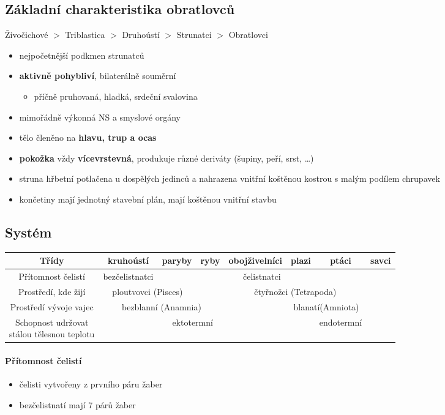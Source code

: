 \subsection{Základní charakteristika obratlovců}
Živočichové $>$ Triblastica $>$ Druhoústí $>$ Strunatci $>$ Obratlovci
\begin{itemize}
\item nejpočetnější podkmen strunatců
\item \textbf{aktivně pohybliví}, bilaterálně souměrní
	\begin{itemize}
	\item příčně pruhovaná, hladká, srdeční svalovina
	\end{itemize}
\item mimořádně výkonná NS a smyslové orgány
\item tělo členěno na \textbf{hlavu, trup a ocas}
\item \textbf{pokožka} vždy \textbf{vícevrstevná}, produkuje různé deriváty (šupiny, peří, srst, \ldots)
\item struna hřbetní potlačena u dospělých jedinců a nahrazena vnitřní koštěnou kostrou s malým podílem chrupavek
\item končetiny mají jednotný stavební plán, mají koštěnou vnitřní stavbu
\end{itemize}

\subsection{Systém}
\begin{tabular}{|c|c|c|c|c|c|c|c|}
\hline
Třídy&kruhoústí&paryby&ryby&obojživelníci&plazi&ptáci&savci		\\ \hline
Přítomnost čelistí&bezčelistnatci& \multicolumn{5}{c}{čelistnatci} &		\\ \hline
Prostředí, kde žijí & \multicolumn{2}{c}{ploutvovci (Pisces)} && \multicolumn{3}{c}{čtyřnožci (Tetrapoda)} &\\ \hline
Prostředí vývoje vajec & \multicolumn{3}{c}{bezblanní (Anamnia)} && \multicolumn{2}{c}{blanatí(Amniota)} &		\\ \hline
\makecell{Schopnost udržovat \\ stálou tělesnou teplotu}	& \multicolumn{4}{c}{ektotermní} && \multicolumn{1}{c}{endotermní} &	\\ \hline
\end{tabular}

\paragraph{Přítomnost čelistí}
\begin{itemize}
\item čelisti vytvořeny z prvního páru žaber
\item bezčelistnatí mají 7 párů žaber
\end{itemize}

